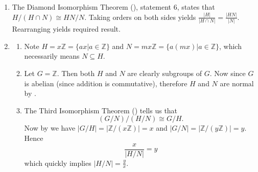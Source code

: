 \begin{enumerate}
    \item The Diamond Isomorphism Theorem (), statement 6, states that $H / (H\cap N) \cong HN / N$. Taking orders on both sides yields $\frac{|H|}{|H \cap N|} = \frac{|HN|}{|N|}$. Rearranging yields required result.

    \item \begin{enumerate}[label=(\roman*)]
        \item Note $H = x\mathbb{Z} = \{ax \vert a \in \mathbb{Z}\}$ and $N = mx\mathbb{Z} = \{a(mx) \vert a \in \mathbb{Z}\}$, which necessarily means $N \subseteq H$.
        \item Let $G = \mathbb{Z}$. Then both $H$ and $N$ are clearly subgroups of $G$. Now since $G$ is abelian (since addition is commutative), therefore $H$ and $N$ are normal by .
        \item The Third Isomorphism Theorem () tells us that
        \[
            (G/N)/(H/N) \cong G/H.
        \]
        Now by  we have $|G/H| = |\mathbb{Z}/(x\mathbb{Z})| = x$ and $|G/N| = |\mathbb{Z}/(y\mathbb{Z})| = y$. Hence
        \[
            \frac{x}{|H/N|} = y
        \]
        which quickly implies $|H/N| = \frac yx$.
    \end{enumerate}
\end{enumerate}

